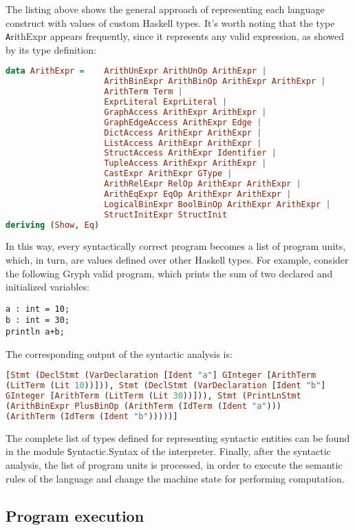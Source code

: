 The listing above shows the general approach of representing each
language construct with values of custom Haskell types.
It's worth noting that the type {\texttt ArithExpr}
appears frequently, since it represents any valid expression, as 
showed by its type definition:

\begin{lstlisting}[language=Haskell,basicstyle=\footnotesize]
data ArithExpr =    ArithUnExpr ArithUnOp ArithExpr | 
                    ArithBinExpr ArithBinOp ArithExpr ArithExpr | 
                    ArithTerm Term |
                    ExprLiteral ExprLiteral |
                    GraphAccess ArithExpr ArithExpr |
                    GraphEdgeAccess ArithExpr Edge |
                    DictAccess ArithExpr ArithExpr |
                    ListAccess ArithExpr ArithExpr |
                    StructAccess ArithExpr Identifier |
                    TupleAccess ArithExpr ArithExpr |
                    CastExpr ArithExpr GType |
                    ArithRelExpr RelOp ArithExpr ArithExpr |
                    ArithEqExpr EqOp ArithExpr ArithExpr |
                    LogicalBinExpr BoolBinOp ArithExpr ArithExpr |
                    StructInitExpr StructInit
deriving (Show, Eq)
\end{lstlisting}

In this way, every syntactically correct program becomes a list
of program units, which, in turn, are values defined over other
Haskell types. For example, consider the following Gryph valid program,
which prints the sum of two declared and initialized variables:

\begin{lstlisting}[language=Gryph]
a : int = 10;
b : int = 30;
println a+b;
\end{lstlisting}

The corresponding output of the syntactic analysis is:

\begin{lstlisting}[language=Haskell,basicstyle=\scriptsize]
[Stmt (DeclStmt (VarDeclaration [Ident "a"] GInteger [ArithTerm 
(LitTerm (Lit 10))])), Stmt (DeclStmt (VarDeclaration [Ident "b"] 
GInteger [ArithTerm (LitTerm (Lit 30))])), Stmt (PrintLnStmt 
(ArithBinExpr PlusBinOp (ArithTerm (IdTerm (Ident "a"))) 
(ArithTerm (IdTerm (Ident "b")))))]
\end{lstlisting}

The complete list of types defined for representing syntactic
entities can be found in the module {\texttt Syntactic.Syntax}
of the interpreter. Finally, after the syntactic analysis, the list of program units
is processed, in order to execute the semantic rules
of the language and change the machine state for performing
computation. 

\subsection{Program execution}
